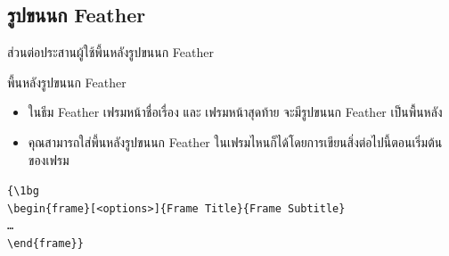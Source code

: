 \documentclass[10pt,xcolor={dvipsnames}]{beamer}
\begin{document}
\subsection{รูปขนนก Feather}
\begin{frame}{ส่วนต่อประสานผู้ใช้}{พี้นหลังรูปขนนก Feather}

\begin{block}{พี้นหลังรูปขนนก Feather}
    \begin{itemize}
    \item ในธีม Feather เฟรมหน้าชื่อเรื่อง และ เฟรมหน้าสุดท้าย จะมีรูปขนนก Feather เป็นพื้นหลัง 
    \item คุณสามารถใส่พี้นหลังรูปขนนก Feather ในเฟรมไหนก็ได้โดยการเขียนสิ่งต่อไปนี้ตอนเริ่มต้นของเฟรม
    \end{itemize} 
    
    \vspace{5pt} 
    
  {\tt \{\textbackslash 1bg\\
    \textbackslash begin\{frame\}[<options>]\{Frame Title\}\{Frame Subtitle\}\\
    \ldots\\
    \textbackslash end\{frame\}\}}
\end{block}
\end{frame}

{\1
\begin{frame}
\end{frame}}
\end{document}
